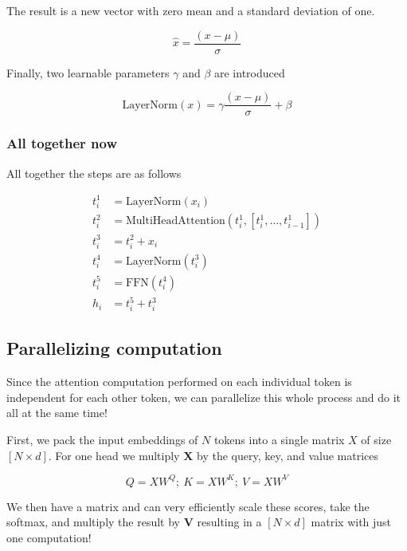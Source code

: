\documentclass[11pt]{article}
\begin{document}
The result is a new vector with zero mean and a standard deviation of one.


\begin{equation*}
	\hat{x} = \frac{( x - \mu )}{\sigma}
\end{equation*}

Finally, two learnable parameters $\gamma$ and $\beta$ are introduced

\begin{equation*}
	\text{LayerNorm}(x) = \gamma \frac{( x - \mu )}{\sigma} + \beta
\end{equation*}

\subsubsection{All together now}

All together the steps are as follows


\begin{align*}
	t^1_i & = \text{LayerNorm}(x_i)                                       \\
	t^2_i & = \text{MultiHeadAttention}(t^1_i, [t^1_i, \dots, t^1_{i-1}]) \\
	t^3_i & = t^2_i + x_i                                                 \\
	t^4_i & = \text{LayerNorm}(t^3_i)                                     \\
	t^5_i & = \text{FFN}(t^4_i)                                           \\
	h_i   & = t^5_i + t^3_i
\end{align*}

\subsection{Parallelizing computation}

Since the attention computation performed on each individual token is independent for each other token, we can parallelize this whole process and do it all at the same time!

First, we pack the input embeddings of $N$ tokens into a single matrix $X$ of size $[N \times d]$. For one head we multiply \textbf{X} by the query, key, and value matrices

\begin{equation*}
  Q = XW^Q; \ K = XW^K ; \ V = XW^V
\end{equation*}

We then have a matrix and can very efficiently scale these scores, take the softmax, and multiply the result by \textbf{V} resulting in a $[N \times d]$ matrix with just one computation!
\end{document}
